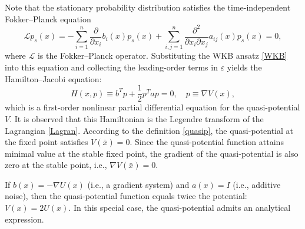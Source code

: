 \documentclass[11pt]{article}
\theoremstyle{plain}      %
\theoremstyle{definition} %
\begin{document}
Note that the stationary probability distribution satisfies the time-independent Fokker–Planck equation 
\[ \mathcal{L}p_s(x) = - \sum_{i=1}^n \frac{\partial}{\partial x_i} b_i(x)p_{s}(x) + \sum_{i,j=1}^n \frac{\partial^2}{\partial x_i \partial x_j} a_{ij}(x)p_{s}(x) = 0, \]
where \( \mathcal{L} \) is the Fokker–Planck operator. Substituting the WKB ansatz \eqref{WKB} into this equation and collecting the leading-order terms in \( \varepsilon \) yields the Hamilton–Jacobi equation:
\begin{equation}
\label{HJE}
H(x, p) \equiv b^{T}p + \frac{1}{2} p^{T}ap = 0, \quad p \equiv \nabla V (x),
\end{equation}
which is a first-order nonlinear partial differential equation for the quasi-potential \( V \). It is observed that this Hamiltonian is the Legendre transform of the Lagrangian \eqref{Lagran}. According to the definition \eqref{quasip}, the quasi-potential at the fixed point satisfies \( V(\bar{x}) = 0 \). Since the quasi-potential function attains minimal value at the stable fixed point, the gradient of the quasi-potential is also zero at the stable point, i.e., $\nabla V(\bar{x}) =0$.

If \( b(x) = -\nabla U(x) \) (i.e., a gradient system) and \( a(x) = I \) (i.e., additive noise), then the quasi-potential function equals twice the potential: \( V(x) = 2U(x) \). In this special case, the quasi-potential admits an analytical expression.
\end{document}
